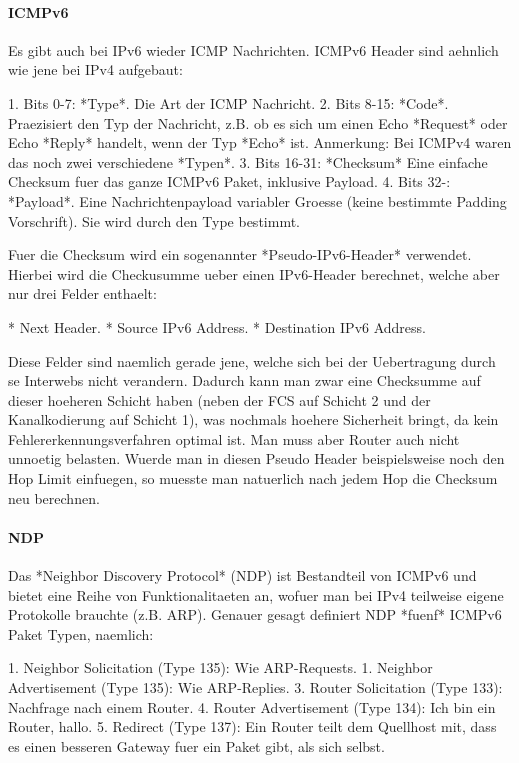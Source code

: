 \paragraph{ICMPv6} 

Es gibt auch bei IPv6 wieder ICMP Nachrichten. ICMPv6 Header sind aehnlich wie
jene bei IPv4 aufgebaut:

1. Bits 0-7: *Type*. Die Art der ICMP Nachricht.
2. Bits 8-15: *Code*. Praezisiert den Typ der Nachricht, z.B. ob es sich um
   einen Echo *Request* oder Echo *Reply* handelt, wenn der Typ *Echo*
   ist. Anmerkung: Bei ICMPv4 waren das noch zwei verschiedene *Typen*.
3. Bits 16-31: *Checksum* Eine einfache Checksum fuer das ganze ICMPv6 Paket,
   inklusive Payload.
4. Bits 32-: *Payload*. Eine Nachrichtenpayload variabler Groesse (keine
   bestimmte Padding Vorschrift). Sie wird durch den Type bestimmt.

Fuer die Checksum wird ein sogenannter *Pseudo-IPv6-Header* verwendet. Hierbei
wird die Checkusumme ueber einen IPv6-Header berechnet, welche aber nur drei
Felder enthaelt:

* Next Header.
* Source IPv6 Address.
* Destination IPv6 Address.

Diese Felder sind naemlich gerade jene, welche sich bei der Uebertragung durch
se Interwebs nicht verandern. Dadurch kann man zwar eine Checksumme auf dieser
hoeheren Schicht haben (neben der FCS auf Schicht 2 und der Kanalkodierung auf
Schicht 1), was nochmals hoehere Sicherheit bringt, da kein
Fehlererkennungsverfahren optimal ist. Man muss aber Router auch nicht unnoetig
belasten. Wuerde man in diesen Pseudo Header beispielsweise noch den Hop Limit
einfuegen, so muesste man natuerlich nach jedem Hop die Checksum neu berechnen.

\paragraph{NDP} 

Das *Neighbor Discovery Protocol* (NDP) ist Bestandteil von ICMPv6 und bietet
eine Reihe von Funktionalitaeten an, wofuer man bei IPv4 teilweise eigene
Protokolle brauchte (z.B. ARP). Genauer gesagt definiert NDP *fuenf* ICMPv6
Paket Typen, naemlich:

1. Neighbor Solicitation (Type 135): Wie ARP-Requests.
1. Neighbor Advertisement (Type 135): Wie ARP-Replies.
3. Router Solicitation (Type 133): Nachfrage nach einem Router.
4. Router Advertisement (Type 134): Ich bin ein Router, hallo.
5. Redirect (Type 137): Ein Router teilt dem Quellhost mit, dass es einen
   besseren Gateway fuer ein Paket gibt, als sich selbst.

